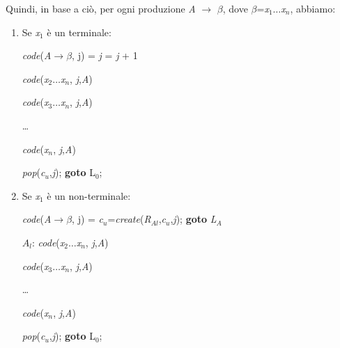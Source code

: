 \vspace{0.5cm}Quindi, in base a ciò, per ogni produzione \textit{A} $\to$ $\beta$, dove $\beta$=\textit{x}$_1$$\dots$\textit{x}$_n$, abbiamo:
\begin{enumerate}
	\item Se \textit{x}$_1$ è un terminale:\par 
	\hspace{2.5cm}\textit{code}(\textit{A}$\to$$\beta$, j) = \hspace{2cm}\textit{j} = \textit{j} + 1\par
	\hspace{7.3cm} \textit{code}(\textit{x}$_2$$\dots$\textit{x}$_n$, \textit{j},\textit{A})\par
	\hspace{7.3cm} \textit{code}(\textit{x}$_3$$\dots$\textit{x}$_n$, \textit{j},\textit{A})\par
	\hspace{7.3cm} \dots \par
	\hspace{7.3cm} \textit{code}(\textit{x}$_n$, \textit{j},\textit{A})\par 
	\hspace{7.3cm} \textit{pop}(\textit{c}$_u$,\textit{j}); \textbf{goto} L$_0$;
	\item Se \textit{x}$_1$ è un non-terminale:\par 
	\hspace{2.2cm}\textit{code}(\textit{A}$\to$$\beta$, j) = \hspace{2cm} \textit{c}$_u$=\textit{create}(\textit{R}$_{Al}$,\textit{c}$_u$,\textit{j}); \textbf{goto} \textit{L}$_A$\par
	\hspace{7.1cm} $A_l$: \textit{code}(\textit{x}$_2$$\dots$\textit{x}$_n$, \textit{j},\textit{A})\par
	\hspace{7.8cm} \textit{code}(\textit{x}$_3$$\dots$\textit{x}$_n$, \textit{j},\textit{A})\par
	\hspace{7.8cm} \dots \par
	\hspace{7.8cm} \textit{code}(\textit{x}$_n$, \textit{j},\textit{A})\par 
	\hspace{7.8cm} \textit{pop}(\textit{c}$_u$,\textit{j}); \textbf{goto} L$_0$;
\end{enumerate}
